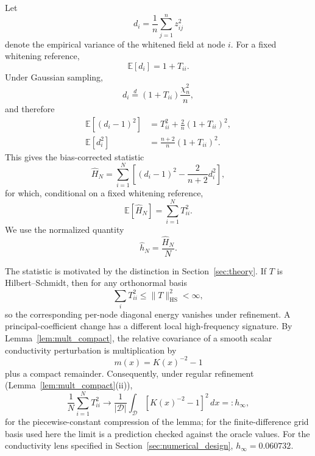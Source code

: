 \documentclass[11pt]{article}
\numberwithin{table}{section}
\numberwithin{figure}{section}
\begin{document}
Let
\begin{equation}
    d_i
    =
    \frac1n
    \sum_{j=1}^{n}z_{ij}^2
    \label{eq:di}
\end{equation}
denote the empirical variance of the whitened field at node $i$. For a fixed whitening reference,
\begin{equation}
    \mathbb E[d_i]
    =
    1+T_{ii}.
\end{equation}
Under Gaussian sampling,
\begin{equation}
    d_i
    \overset{d}{=}
    (1+T_{ii})\frac{\chi_n^2}{n},
\end{equation}
and therefore
\begin{align}
    \mathbb E\left[(d_i-1)^2\right]
    &=
    T_{ii}^2
    +
    \frac{2}{n}(1+T_{ii})^2,\\
    \mathbb E[d_i^2]
    &=
    \frac{n+2}{n}(1+T_{ii})^2.
\end{align}
This gives the bias-corrected statistic
\begin{equation}
    \widehat H_N
    =
    \sum_{i=1}^{N}
    \left[
        (d_i-1)^2
        -
        \frac{2}{n+2}d_i^2
    \right],
    \label{eq:Hhat}
\end{equation}
for which, conditional on a fixed whitening reference,
\begin{equation}
    \mathbb E[\widehat H_N]
    =
    \sum_{i=1}^{N}T_{ii}^2.
    \label{eq:H_unbiased}
\end{equation}
We use the normalized quantity
\begin{equation}
    \widehat h_N
    =
    \frac{\widehat H_N}{N}.
    \label{eq:hhat}
\end{equation}

The statistic is motivated by the distinction in Section~\ref{sec:theory}. If $T$ is Hilbert--Schmidt, then for any orthonormal basis
\begin{equation}
    \sum_i T_{ii}^2
    \le
    \|T\|_{\mathrm{HS}}^2
    <\infty,
\end{equation}
so the corresponding per-node diagonal energy vanishes under refinement. A principal-coefficient change has a different local high-frequency signature. By Lemma~\ref{lem:mult_compact}, the relative covariance of a smooth scalar conductivity perturbation is multiplication by
\begin{equation}
    m(x)
    =
    K(x)^{-2}-1
\end{equation}
plus a compact remainder. Consequently, under regular refinement (Lemma~\ref{lem:mult_compact}(ii)),
\begin{equation}
    \frac1N\sum_{i=1}^{N}T_{ii}^2
    \longrightarrow
    \frac{1}{|\mathcal D|}
    \int_{\mathcal D}
    \left[K(x)^{-2}-1\right]^2\,dx
    =:
    h_\infty,
    \label{eq:hlimit}
\end{equation}
for the piecewise-constant compression of the lemma; for the finite-difference grid basis used here the limit is a prediction checked against the oracle values. For the conductivity lens specified in Section~\ref{sec:numerical_design}, $h_\infty=0.060732$.
\end{document}
